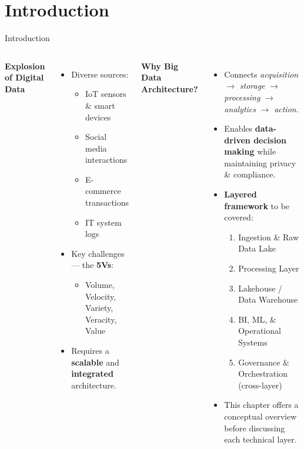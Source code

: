 \documentclass[aspectratio=169, table]{beamer}
\begin{document}
\section{Introduction}
\begin{frame}[fragile]{Introduction}
	\vspace{20pt}
	\begin{columns}[T]
		\textbf{Explosion of Digital Data}
		\begin{itemize}
			\item Diverse sources:
			\begin{itemize}
				\item IoT sensors \& smart devices
				\item Social media interactions
				\item E-commerce transactions
				\item IT system logs
			\end{itemize}
			\item Key challenges — the \textbf{5Vs}:
			\begin{itemize}
				\item Volume, Velocity, Variety, Veracity, Value
			\end{itemize}
			\item Requires a \textbf{scalable} and \textbf{integrated} architecture.
		\end{itemize}
		
		\textbf{Why Big Data Architecture?}
		\begin{itemize}
			\item Connects \emph{acquisition} $\rightarrow$ \emph{storage} $\rightarrow$ \emph{processing} $\rightarrow$ \emph{analytics} $\rightarrow$ \emph{action}.
			\item Enables \textbf{data-driven decision making} while maintaining privacy \& compliance.
			\item \textbf{Layered framework} to be covered:
			\begin{enumerate}
				\item Ingestion \& Raw Data Lake
				\item Processing Layer
				\item Lakehouse / Data Warehouse
				\item BI, ML, \& Operational Systems
				\item Governance \& Orchestration (cross-layer)
			\end{enumerate}
			\item This chapter offers a conceptual overview before discussing each technical layer.
		\end{itemize}
	\end{columns}
\end{frame}
\end{document}
